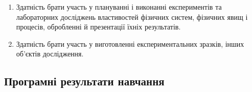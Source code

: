 \documentclass{Syllabus}
\begin{document}
\begin{enumerate}
\item [ФК 2:] Здатність брати участь у плануванні і виконанні експериментів та лабораторних досліджень властивостей фізичних систем, фізичних явищ і процесів, обробленні й презентації їхніх результатів.
\item [ФК 3:] Здатність брати участь у виготовленні експериментальних зразків, інших об'єктів дослідження.
\end{enumerate}

\subsection*{Програмні результати навчання}
\end{document}
